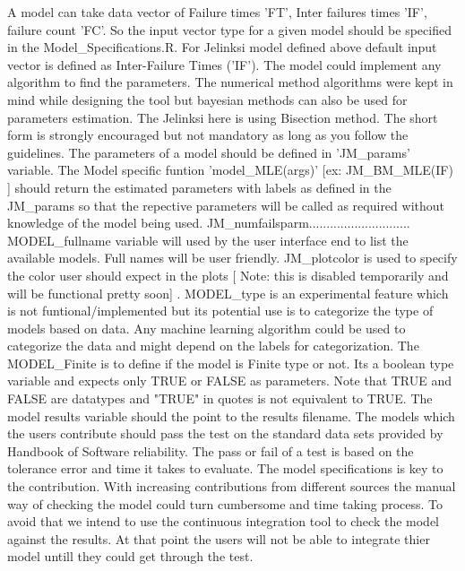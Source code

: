 \documentclass[journal]{IEEEtran}
\begin{document}
A model can take data vector of Failure times 'FT', Inter failures times 'IF', failure count 'FC'. So the input vector type for a given model should be specified in the Model_Specifications.R. For Jelinksi model defined above default input vector is defined as Inter-Failure Times ('IF'). The model could implement any algorithm to find the parameters. The numerical method algorithms were kept in mind while designing the tool but bayesian methods can also be used for parameters estimation. The Jelinksi here is using Bisection method. The short form is strongly encouraged but not mandatory as long as you follow the guidelines. The parameters of a model should be defined in 'JM_params' variable. The Model specific funtion '{model}_MLE({args})' [ex: JM_BM_MLE(IF) ] should return the estimated parameters with labels as defined in the JM_params so that the repective parameters will be called as required without knowledge of the model being used. JM_numfailsparm............................. {MODEL}_fullname variable will used by the user interface end to list the available models. Full names will be user friendly. JM_plotcolor is used to specify the color user should expect in the plots [ Note: this is disabled temporarily and will be functional pretty soon] . {MODEL}_type is an experimental feature which is not funtional/implemented but its potential use is to categorize the type of models based on data. Any machine learning algorithm could be used to categorize the data and might depend on the labels for categorization. The {MODEL}_Finite is to define if the model is Finite type or not. Its a boolean type variable and expects only TRUE or FALSE as parameters. Note that TRUE and FALSE are datatypes and "TRUE" in quotes is not equivalent to TRUE.  The model results variable should the point to the results filename. The models which the users contribute should pass the test on the standard data sets provided by Handbook of Software reliability. The pass or fail of a test is based on the tolerance error and time it takes to evaluate. The model specifications is key to the contribution. With increasing contributions from different sources the manual way of checking the model could turn cumbersome and time taking process. To avoid that we intend to use the continuous integration tool to check the model against the results. At that point the users will not be able to integrate thier model untill they could get through the test.  
\end{document}
